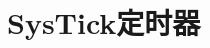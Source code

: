 \renewenvironment{longtable}{\rowcolors{2}{LightGray}{white}\oldlongtable} {\endoldlongtable}
\chapter{SysTick定时器}



















